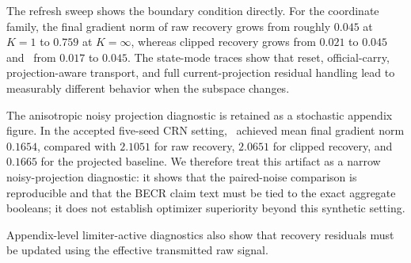 The refresh sweep shows the boundary condition directly. For the coordinate
family, the final gradient norm of raw recovery grows from roughly $0.045$ at
$K=1$ to $0.759$ at $K=\infty$, whereas clipped recovery grows from $0.021$ to
$0.045$ and \BECR\ from $0.017$ to $0.045$. The state-mode traces show that
reset, official-carry, projection-aware transport, and full current-projection
residual handling lead to measurably different behavior when the subspace
changes.

The anisotropic noisy projection diagnostic is retained as a stochastic
appendix figure. In the accepted five-seed CRN setting, \BECR\ achieved mean
final gradient norm $0.1654$, compared with $2.1051$ for raw recovery,
$2.0651$ for clipped recovery, and $0.1665$ for the projected baseline. We
therefore treat this artifact as a narrow noisy-projection diagnostic: it shows
that the paired-noise comparison is reproducible and that the BECR claim text
must be tied to the exact aggregate booleans; it does not establish optimizer
superiority beyond this synthetic setting.

Appendix-level limiter-active diagnostics also show that recovery residuals
must be updated using the effective transmitted raw signal.
